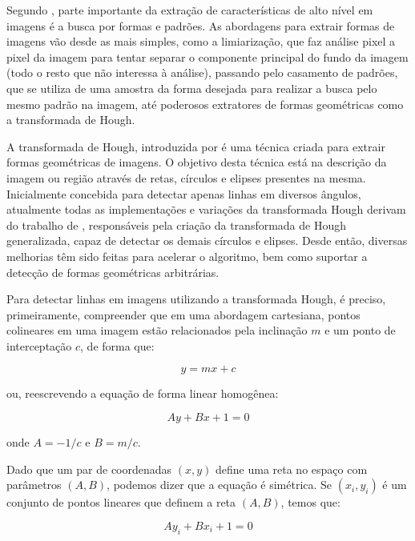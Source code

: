 Segundo , parte importante da extração de características de alto nível em imagens é a busca por formas e padrões. As abordagens para extrair formas de imagens vão desde as mais simples, como a limiarização, que faz análise pixel a pixel da imagem para tentar separar o componente principal do fundo da imagem (todo o resto que não interessa à análise), passando pelo casamento de padrões, que se utiliza de uma amostra da forma desejada para realizar a busca pelo mesmo padrão na imagem, até poderosos extratores de formas geométricas como a transformada de Hough.

A transformada de Hough, introduzida por  é uma técnica criada para extrair formas geométricas de imagens. O objetivo desta técnica está na descrição da imagem ou região através de retas, círculos e elipses presentes na mesma. Inicialmente concebida para detectar apenas linhas em diversos ângulos, atualmente todas as implementações e variações da transformada Hough derivam do trabalho de , responsáveis pela criação da transformada de Hough generalizada, capaz de detectar os demais círculos e elipses. Desde então, diversas melhorias têm sido feitas para acelerar o algoritmo, bem como suportar a detecção de formas geométricas arbitrárias.

Para detectar linhas em imagens utilizando a transformada Hough, é preciso, primeiramente, compreender que em uma abordagem cartesiana, pontos colineares em uma imagem estão relacionados pela inclinação $m$ e um ponto de interceptação $c$, de forma que:

\begin{equation}
	\displaystyle y = mx + c
\end{equation}

ou, reescrevendo a equação de forma linear homogênea:

\begin{equation}
	\displaystyle Ay + Bx + 1 = 0
\end{equation}

onde $A = -1/c$ e $B = m/c$.

Dado que um par de coordenadas $(x,y)$ define uma reta no espaço com parâmetros $(A,B)$, podemos dizer que a equação é simétrica. Se ${(x_i,y_i)}$ é um conjunto de pontos lineares que definem a reta $(A,B)$, temos que:

\begin{equation}
	\displaystyle Ay_i + Bx_i + 1 = 0
\end{equation}

